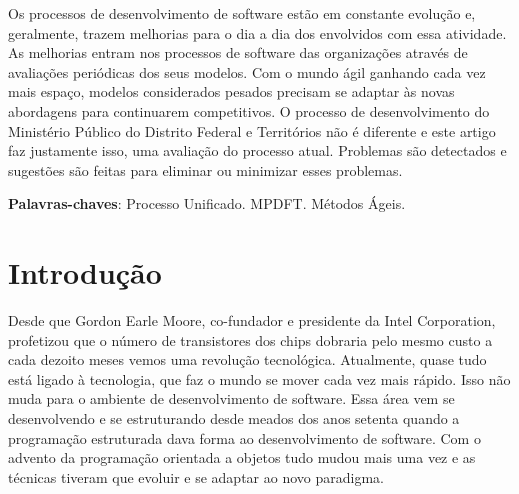 \documentclass[
	article,			%
	11pt,				%
	oneside,			%
	a4paper,			%
	english,			%
	brazil,				%
	sumario=tradicional
	]{abntex2}
\begin{document}
\frenchspacing 


%
%
\maketitle

\begin{resumoumacoluna}

   Os processos de desenvolvimento de software estão em constante evolução e,
   geralmente, trazem melhorias para o dia a dia dos envolvidos com essa
   atividade. As melhorias entram nos processos de software das organizações
   através de avaliações periódicas dos seus modelos. Com o mundo ágil ganhando
   cada vez mais espaço, modelos considerados pesados precisam se adaptar às
   novas abordagens para continuarem competitivos. O processo de desenvolvimento
   do Ministério Público do Distrito Federal e Territórios não é diferente e
   este artigo faz justamente isso, uma avaliação do processo atual. Problemas
   são detectados e sugestões são feitas para eliminar ou minimizar esses
   problemas.

   \vspace{\onelineskip}

   \noindent
   \textbf{Palavras-chaves}: Processo Unificado. MPDFT. Métodos Ágeis.
\end{resumoumacoluna}


\textual

\section*{Introdução}

Desde que Gordon Earle Moore, co-fundador e presidente da Intel Corporation,
profetizou que o número de transistores dos chips dobraria pelo mesmo custo a
cada dezoito meses vemos uma revolução tecnológica. Atualmente, quase tudo está
ligado à tecnologia, que faz o mundo se mover cada vez mais rápido. Isso não
muda para o ambiente de desenvolvimento de software. Essa área vem se
desenvolvendo e se estruturando desde meados dos anos setenta quando a
programação estruturada dava forma ao desenvolvimento de software. Com o advento
da programação orientada a objetos tudo mudou mais uma vez e as técnicas tiveram
que evoluir e se adaptar ao novo paradigma.
\end{document}
